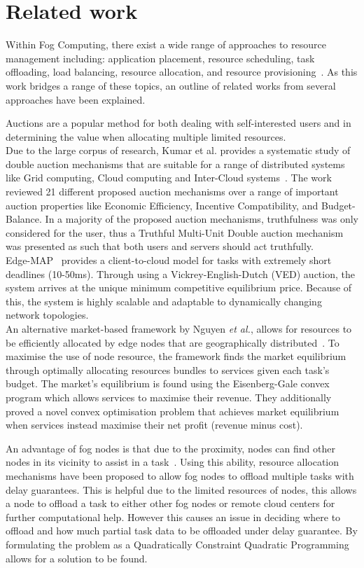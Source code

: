 \section{Related work}
\label{sec:related-work}
Within Fog Computing, there exist a wide range of approaches to resource management including:
application placement, resource scheduling, task offloading, load balancing, resource allocation,
and resource provisioning~\cite{ghobaei2019resource}. As this work bridges a range of these topics, an outline of
related works from several approaches have been explained.

Auctions are a popular method for both dealing with self-interested users and in determining the value when allocating
multiple limited resources. \\
Due to the large corpus of research, Kumar et al. provides a systematic study of double auction mechanisms that are
suitable for a range of distributed systems like Grid computing, Cloud computing and Inter-Cloud
systems~\cite{KUMAR2017234}. The work reviewed 21 different proposed auction mechanisms over a range of important auction
properties like Economic Efficiency, Incentive Compatibility, and Budget-Balance. In a majority of the proposed auction
mechanisms, truthfulness was only considered for the user, thus a Truthful Multi-Unit Double auction mechanism was
presented as such that both users and servers should act truthfully. \\
Edge-MAP~\cite{tasiopoulos2018edge} provides a client-to-cloud model for tasks with extremely short deadlines
(10-50ms). Through using a Vickrey-English-Dutch (VED) auction, the system arrives at the unique minimum competitive
equilibrium price. Because of this, the system is highly scalable and adaptable to dynamically changing network
topologies. \\
An alternative market-based framework by Nguyen \emph{et al.}, allows for resources to be efficiently allocated by edge nodes
that are geographically distributed~\cite{8373684}. To maximise the use of node resource, the framework finds the market
equilibrium through optimally allocating resources bundles to services given each task's budget. The market's
equilibrium is found using the Eisenberg-Gale convex program which allows services to maximise their revenue. They
additionally proved a novel convex optimisation problem that achieves market equilibrium when services instead maximise
their net profit (revenue minus cost).

An advantage of fog nodes is that due to the proximity, nodes can find other nodes in its vicinity to assist in a
task~\cite{8839780}. Using this ability, resource allocation mechanisms have been proposed to allow fog nodes to offload
multiple tasks with delay guarantees. This is helpful due to the limited resources of nodes, this allows a node to
offload a task to either other fog nodes or remote cloud centers for further computational help. However this causes an
issue in deciding where to offload and how much partial task data to be offloaded under delay guarantee. By formulating
the problem as a Quadratically Constraint Quadratic Programming allows for a solution to be found.

